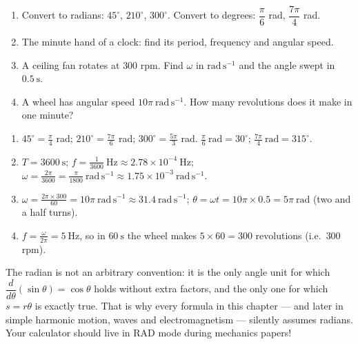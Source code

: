 \documentclass[11pt]{article}
\begin{document}
\begin{exercice}[Consolidation]
\begin{enumerate}
\item Convert to radians: $45^{\circ}$, $210^{\circ}$, $300^{\circ}$. Convert to degrees: $\dfrac{\pi}{6}$ rad, $\dfrac{7\pi}{4}$ rad.
\item The minute hand of a clock: find its period, frequency and angular speed.
\item A ceiling fan rotates at $300$ rpm. Find $\omega$ in $\mathrm{rad\,s^{-1}}$ and the angle swept in $0.5\ \mathrm{s}$.
\item A wheel has angular speed $10\pi\ \mathrm{rad\,s^{-1}}$. How many revolutions does it make in one minute?
\end{enumerate}
\end{exercice}

\begin{corrige}[Exercise 1]
\begin{enumerate}
\item $45^{\circ} = \frac{\pi}{4}$ rad; $210^{\circ} = \frac{7\pi}{6}$ rad; $300^{\circ} = \frac{5\pi}{3}$ rad. $\frac{\pi}{6}\ \text{rad} = 30^{\circ}$; $\frac{7\pi}{4}\ \text{rad} = 315^{\circ}$.
\item $T = 3600\ \mathrm{s}$; $f = \frac{1}{3600}\ \mathrm{Hz} \approx 2.78\times 10^{-4}\ \mathrm{Hz}$; $\omega = \frac{2\pi}{3600} = \frac{\pi}{1800}\ \mathrm{rad\,s^{-1}} \approx 1.75\times 10^{-3}\ \mathrm{rad\,s^{-1}}$.
\item $\omega = \frac{2\pi\times 300}{60} = 10\pi\ \mathrm{rad\,s^{-1}} \approx 31.4\ \mathrm{rad\,s^{-1}}$; $\theta = \omega t = 10\pi \times 0.5 = 5\pi\ \text{rad}$ (two and a half turns).
\item $f = \frac{\omega}{2\pi} = 5\ \mathrm{Hz}$, so in $60\ \mathrm{s}$ the wheel makes $5\times 60 = 300$ revolutions (i.e.\ $300$ rpm).
\end{enumerate}
\end{corrige}

\begin{savaistu}
The radian is not an arbitrary convention: it is the only angle unit for which $\dfrac{d}{d\theta}(\sin\theta) = \cos\theta$ holds without extra factors, and the only one for which $s = r\theta$ is exactly true. That is why every formula in this chapter — and later in simple harmonic motion, waves and electromagnetism — silently assumes radians. Your calculator should live in RAD mode during mechanics papers!
\end{savaistu}
\end{document}

